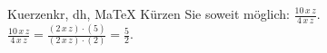 \begin{MAufgabe}{Kuerzen}{kr, dh, MaTeX}
K\"urzen Sie soweit m\"oglich: $\frac{10\, x\, z}{4\, x\, z}$.\\ 
\ifLsg\MLoesung
\quad $\frac{10\, x\, z}{4\, x\, z}=\frac{(2\, x\, z)\cdot(5)}{(2\, x\, z)\cdot(2)}=\frac{5}{2}$.\else\relax\fi
 \end{MAufgabe}